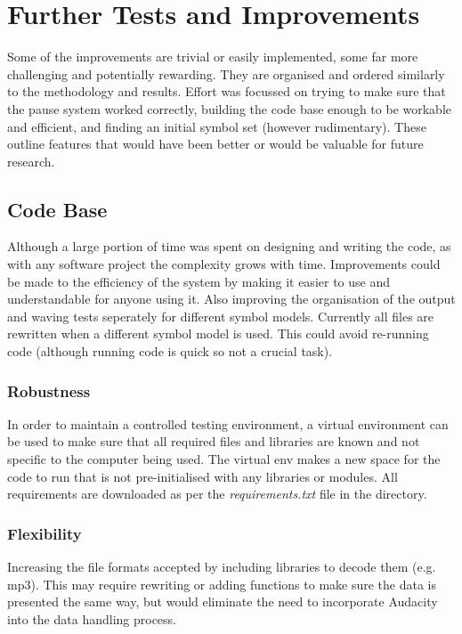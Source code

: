 \section{Further Tests and Improvements}

Some of the improvements are trivial or easily implemented, some far more challenging and potentially rewarding. They are organised and ordered similarly to the methodology and results. Effort was focussed on trying to make sure that the pause system worked correctly, building the code base enough to be workable and efficient, and finding an initial symbol set (however rudimentary). These outline features that would have been better or would be valuable for future research.


\subsection{Code Base}
Although a large portion of time was spent on designing and writing the code, as with any software project the complexity grows with time. Improvements could be made to the efficiency of the system by making it easier to use and understandable for anyone using it. Also improving the organisation of the output and waving tests seperately for different symbol models. Currently all files are rewritten when a different symbol model is used. This could avoid re-running code (although running code is quick so not a crucial task). \\

\subsubsection{Robustness}
In order to maintain a controlled testing environment, a virtual environment can be used to make sure that all required files and libraries are known and not specific
to the computer being used. The virtual env makes a new space for the code to run that 
is not pre-initialised with any libraries or modules. All requirements are downloaded as per the 
\emph{requirements.txt} file in the directory. \\

\subsubsection{Flexibility}
Increasing the file formats accepted by including libraries to decode them (e.g. mp3). This may require rewriting or adding functions to make sure the data is presented the same way, but would eliminate the need to incorporate Audacity into the data handling process.

